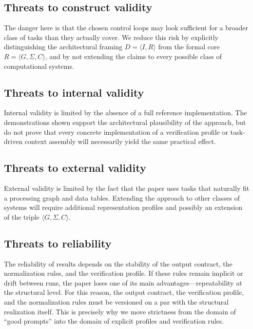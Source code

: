 \documentclass[12pt,a4paper]{article}
\begin{document}
\subsection{Threats to construct validity}

The danger here is that the chosen control loops may look sufficient for a broader class of tasks than they actually cover. We reduce this risk by explicitly distinguishing the architectural framing $D = \langle I, R \rangle$ from the formal core $R = \langle G, \Sigma, C \rangle$, and by not extending the claims to every possible class of computational systems.

\subsection{Threats to internal validity}

Internal validity is limited by the absence of a full reference implementation. The demonstrations shown support the architectural plausibility of the approach, but do not prove that every concrete implementation of a verification profile or task-driven context assembly will necessarily yield the same practical effect.

\subsection{Threats to external validity}

External validity is limited by the fact that the paper uses tasks that naturally fit a processing graph and data tables. Extending the approach to other classes of systems will require additional representation profiles and possibly an extension of the triple $\langle G, \Sigma, C \rangle$.

\subsection{Threats to reliability}

The reliability of results depends on the stability of the output contract, the normalization rules, and the verification profile. If these rules remain implicit or drift between runs, the paper loses one of its main advantages---repeatability at the structural level. For this reason, the output contract, the verification profile, and the normalization rules must be versioned on a par with the structural realization itself. This is precisely why we move strictness from the domain of ``good prompts'' into the domain of explicit profiles and verification rules.
\end{document}
